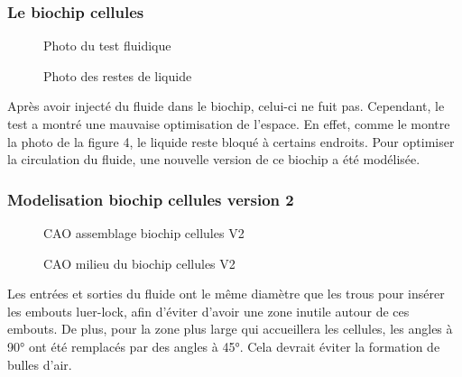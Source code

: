 \documentclass[a4paper, 11pt]{article}
\begin{document}
\subsubsection{Le biochip cellules}
\begin{multicols}{2}
    \begin{figure}[H]
        \centering
        \caption{Photo du test fluidique}
        \label{fig: fluide_cellules}
    \end{figure}
    \begin{figure}[H]
        \centering
        \caption{Photo des restes de liquide}
        \label{fig:reste_cellules}
    \end{figure}
\end{multicols}
Après avoir injecté du fluide dans le biochip, celui-ci ne fuit pas. Cependant, le test a montré une mauvaise optimisation de l'espace. En effet, comme le montre la photo de la figure 4, le liquide reste bloqué à certains endroits. Pour optimiser la circulation du fluide, une nouvelle version de ce biochip a été modélisée.
\newpage
\subsubsection{Modelisation biochip cellules version 2}
\begin{multicols}{2}
    \begin{figure}[H]
        \centering
        \caption{CAO assemblage biochip cellules V2}
        \label{fig: CAO_cellulesV2}
    \end{figure}
    \begin{figure}[H]
        \centering
        \caption{CAO milieu du biochip cellules V2}
        \label{fig:milieu_cellulesV2}
    \end{figure}
\end{multicols}
Les entrées et sorties du fluide ont le même diamètre que les trous pour insérer les embouts luer-lock, afin d'éviter d'avoir une zone inutile autour de ces embouts.
De plus, pour la zone plus large qui accueillera les cellules, les angles à 90° ont été remplacés par des angles à 45°. Cela devrait éviter la formation de bulles d'air.
\end{document}
